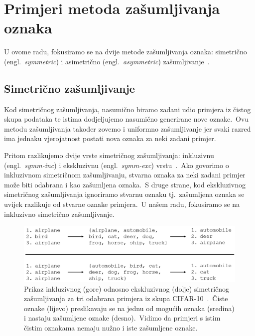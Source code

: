 \documentclass[diplomskirad]{fer}
\begin{document}
\section{Primjeri metoda zašumljivanja oznaka}
\label{sek:primjeri_zasumljivanja}

U ovome radu, fokusiramo se na dvije metode zašumljivanja oznaka: simetrično (engl.\ \textit{symmetric}) i asimetrično (engl.\ \textit{asymmetric}) zašumljivanje~\cite{cordeiro2020survey}.\

\subsection{Simetrično zašumljivanje}
\label{sub:sym}

Kod simetričnog zašumljivanja, nasumično biramo zadani udio primjera iz čistog skupa podataka te istima dodjeljujemo nasumično generirane nove oznake.\ 
Ovu metodu zašumljivanja također zovemo i uniformno zašumljivanje jer svaki razred ima jednaku vjerojatnost postati nova oznaka za neki zadani primjer.\ 
  
Pritom razlikujemo dvije vrste simetričnog zašumljivanja: inkluzivnu (engl.\ \textit{symm-inc}) i ekskluzivnu (engl.\ \textit{symm-exc}) vrstu~\cite{cordeiro2020survey}.\ 
Ako govorimo o inkluzivnom simetričnom zašumljivanju, stvarna oznaka za neki zadani primjer može biti odabrana i kao zašumljena oznaka.\ 
S druge strane, kod ekskluzivnog simetričnog zašumljivanja ignoriramo stvarnu oznaku tj.\ zašumljena oznaka se uvijek razlikuje od stvarne oznake primjera.\ 
U našem radu, fokusiramo se na inkluzivno simetrično zašumljivanje.\ 

\pagebreak

\begin{figure}[h]
  \centering
  \includegraphics[scale=0.7]{./Slike/sym.png}
  \caption{Prikaz inkluzivnog (gore) odnosno ekskluzivnog (dolje) simetričnog zašumljivanja za tri odabrana primjera iz skupa CIFAR-10~\cite{krizhevsky2009learning}.\ Čiste oznake (lijevo) preslikavaju se na jednu od mogućih oznaka (sredina) i nastaju zašumljene oznake (desno).\ Vidimo da primjeri s istim čistim oznakama nemaju nužno i iste zašumljene oznake.}
  \label{fig:sym}
\end{figure}
\end{document}
